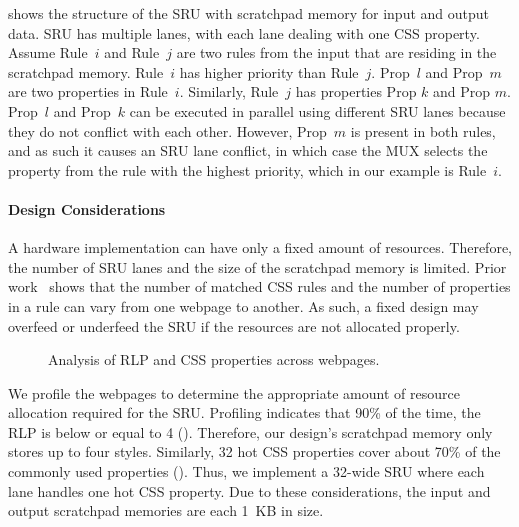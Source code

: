  shows the structure of the SRU with scratchpad memory for input and output data. SRU has multiple lanes, with each lane dealing with one CSS property. Assume Rule~$i$ and Rule~$j$ are two rules from the input that are residing in the scratchpad memory. Rule~$i$ has higher priority than Rule~$j$. Prop~$l$ and Prop~$m$ are two properties in Rule~$i$. Similarly, Rule~$j$ has properties Prop $k$ and Prop $m$. Prop~$l$ and Prop~$k$ can be executed in parallel using different SRU lanes because they do not conflict with each other. However, Prop~$m$ is present in both rules, and as such it causes an SRU lane conflict, in which case the MUX selects the property from the rule with the highest priority, which in our example is Rule~$i$.


\paragraph{Design Considerations} A hardware implementation can have only a fixed amount of resources. Therefore, the number of SRU lanes and the size of the scratchpad memory is limited. Prior work~\cite{big-little} shows that the number of matched CSS rules and the number of properties in a rule can vary from one webpage to another. As such, a fixed design may overfeed or underfeed the SRU if the resources are not allocated properly.

\begin{figure}[t]
\centering
{}
\hspace*{15pt}
\caption{\small Analysis of RLP and CSS properties across webpages.}
\label{fig:para}
\end{figure}

We profile the webpages to determine the appropriate amount of resource allocation required for the SRU. Profiling indicates that 90\% of the time, the RLP is below or equal to 4 (). Therefore, our design's scratchpad memory only stores up to four styles. Similarly, 32 hot CSS properties cover about 70\% of the commonly used properties (). Thus, we implement a 32-wide SRU where each lane handles one hot CSS property. Due to these considerations, the input and output scratchpad memories are each 1~KB in size.

